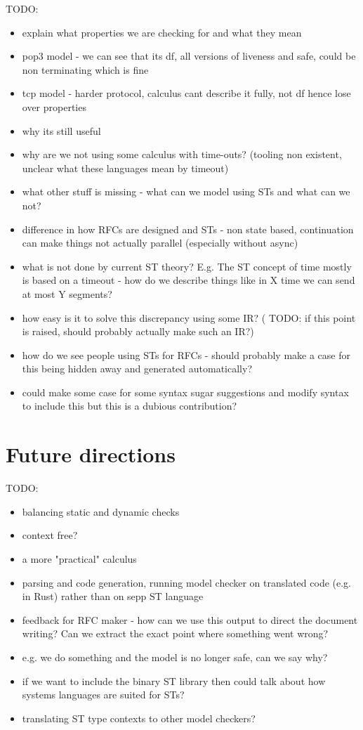 \documentclass{article}
\newcommand{\todo}[1]{}
\renewcommand{\todo}[1]{{\color{red} TODO: {#1}}}
\begin{document}
\todo{
    \begin{itemize}
        \item explain what properties we are checking for and what they mean
        \item pop3 model - we can see that its df, all versions of liveness and safe, could be non terminating which is fine
        \item tcp model - harder protocol, calculus cant describe it fully, not df hence lose over properties
        \item why its still useful
        \item why are we not using some calculus with time-outs? (tooling non existent, unclear what these languages mean by timeout)
        \item what other stuff is missing - what can we model using STs and what can we not?
        \item difference in how RFCs are designed and STs - non state based, continuation can make things not actually parallel (especially without async)
        \item what is not done by current ST theory? E.g. The ST concept of time mostly is based on a timeout - how do we describe things like in X time we can send at most Y segments?
        \item how easy is it to solve this discrepancy using some IR? (\todo{if this point is raised, should probably actually make such an IR?})
        \item how do we see people using STs for RFCs - should probably make a case for this being hidden away and generated automatically?
        \item could make some case for some syntax sugar suggestions and modify syntax to include this but this is a dubious contribution?
    \end{itemize}
}

\section{Future directions}

\todo{
    \begin{itemize}
        \item balancing static and dynamic checks
        \item context free?
        \item a more "practical" calculus
        \item parsing and code generation, running model checker on translated code (e.g. in Rust) rather than on sepp ST language
        \item feedback for RFC maker - how can we use this output to direct the document writing? Can we extract the exact point where something went wrong?
        \item e.g. we do something and the model is no longer safe, can we say why?
        \item if we want to include the binary ST library then could talk about how systems languages are suited for STs?
        \item translating ST type contexts to other model checkers?
    \end{itemize}
}
\end{document}
